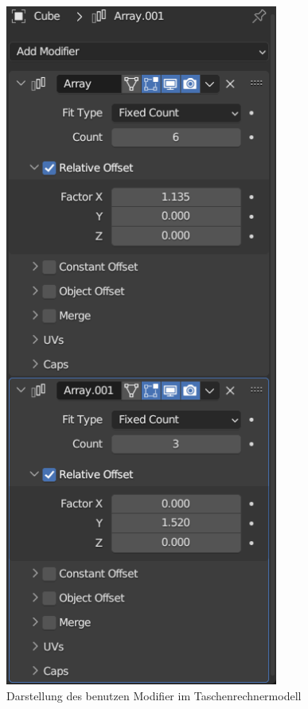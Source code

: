 \begin{figure}[H]
\centering
\includegraphics[width=0.8\textwidth]{images/blendermodifier.png}
\caption{Darstellung des benutzen Modifier im Taschenrechnermodell}
\label{fig:blendermodifier}
\end{figure}

